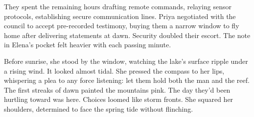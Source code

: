 They spent the remaining hours drafting remote commands, relaying sensor protocols, establishing secure communication lines. Priya negotiated with the council to accept pre-recorded testimony, buying them a narrow window to fly home after delivering statements at dawn. Security doubled their escort. The note in Elena's pocket felt heavier with each passing minute.

Before sunrise, she stood by the window, watching the lake's surface ripple under a rising wind. It looked almost tidal. She pressed the compass to her lips, whispering a plea to any force listening: let them hold both the man and the reef. The first streaks of dawn painted the mountains pink. The day they'd been hurtling toward was here. Choices loomed like storm fronts. She squared her shoulders, determined to face the spring tide without flinching.

